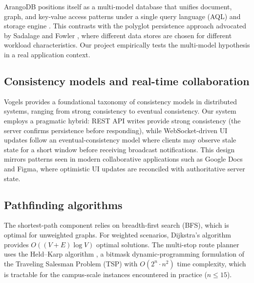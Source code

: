\documentclass[13pt,a4paper]{report}
\begin{document}
ArangoDB positions itself as a multi-model database that unifies document, graph, and key-value access patterns under a single query language (AQL) and storage engine \cite{arangodb_multimodel,arangodb_aql}. This contrasts with the polyglot persistence approach advocated by Sadalage and Fowler \cite{sadalage2012nosql}, where different data stores are chosen for different workload characteristics. Our project empirically tests the multi-model hypothesis in a real application context.

\subsection{Consistency models and real-time collaboration}
Vogels \cite{vogels2009eventually} provides a foundational taxonomy of consistency models in distributed systems, ranging from strong consistency to eventual consistency. Our system employs a pragmatic hybrid: REST API writes provide strong consistency (the server confirms persistence before responding), while WebSocket-driven UI updates follow an eventual-consistency model where clients may observe stale state for a short window before receiving broadcast notifications. This design mirrors patterns seen in modern collaborative applications such as Google Docs and Figma, where optimistic UI updates are reconciled with authoritative server state.

\subsection{Pathfinding algorithms}
The shortest-path component relies on breadth-first search (BFS), which is optimal for unweighted graphs. For weighted scenarios, Dijkstra's algorithm \cite{dijkstra1959} provides $O((V+E)\log V)$ optimal solutions. The multi-stop route planner uses the Held--Karp algorithm \cite{bellman1962,held1962dynamic}, a bitmask dynamic-programming formulation of the Traveling Salesman Problem (TSP) with $O(2^n \cdot n^2)$ time complexity, which is tractable for the campus-scale instances encountered in practice ($n \leq 15$).
\end{document}

